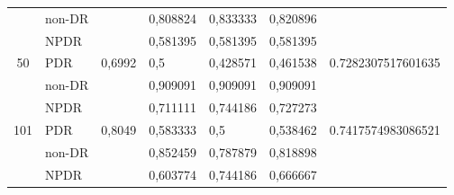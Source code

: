 \begin{table}[hbtp]
\begin{center}
\begin{tabular}{|c|l|c|l|l|l|c|}
                                  & non-DR                                             &                          & 0,808824                                          & 0,833333                                         & 0,820896                                        &                                      \\ \cline{2-2} \cline{4-6}
                                  & NPDR                                               &                          & 0,581395                                          & 0,581395                                         & 0,581395                                        &                                      \\ \cline{2-2} \cline{4-6}
            \multirow{-3}{*}{50}  & PDR                                                & \multirow{-3}{*}{0,6992} & 0,5                                               & 0,428571                                         & 0,461538                                        & \multirow{-3}{*}{0.7282307517601635} \\ \hline
                                  & non-DR                                             &                          & 0,909091                                          & 0,909091                                         & 0,909091                                        &                                      \\ \cline{2-2} \cline{4-6}
                                  & NPDR                                               &                          & 0,711111                                          & 0,744186                                         & 0,727273                                        &                                      \\ \cline{2-2} \cline{4-6}
            \multirow{-3}{*}{101} & PDR                                                & \multirow{-3}{*}{0,8049} & 0,583333                                          & 0,5                                              & 0,538462                                        & \multirow{-3}{*}{0.7417574983086521} \\ \hline
                                  & non-DR                                             &                          & 0,852459                                          & 0,787879                                         & 0,818898                                        &                                      \\ \cline{2-2} \cline{4-6}
                                  & NPDR                                               &                          & 0,603774                                          & 0,744186                                         & 0,666667                                        &                                      \\ \cline{2-2} \cline{4-6}

\end{tabular}
\end{center}
\end{table}

